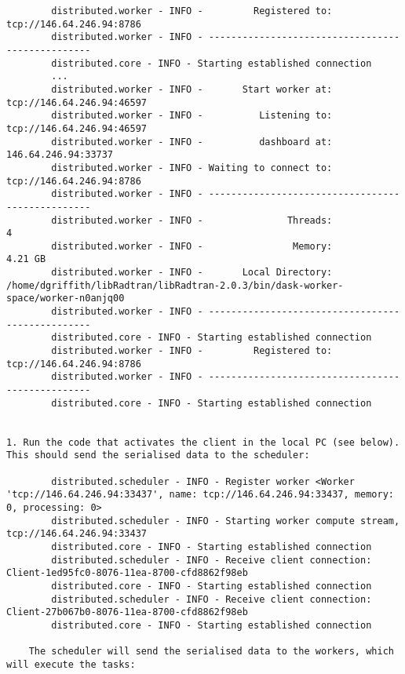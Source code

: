 \begin{lstlisting}
        distributed.worker - INFO -         Registered to:   tcp://146.64.246.94:8786
        distributed.worker - INFO - -------------------------------------------------
        distributed.core - INFO - Starting established connection
        ...
        distributed.worker - INFO -       Start worker at:  tcp://146.64.246.94:46597
        distributed.worker - INFO -          Listening to:  tcp://146.64.246.94:46597
        distributed.worker - INFO -          dashboard at:        146.64.246.94:33737
        distributed.worker - INFO - Waiting to connect to:   tcp://146.64.246.94:8786
        distributed.worker - INFO - -------------------------------------------------
        distributed.worker - INFO -               Threads:                          4
        distributed.worker - INFO -                Memory:                    4.21 GB
        distributed.worker - INFO -       Local Directory: /home/dgriffith/libRadtran/libRadtran-2.0.3/bin/dask-worker-space/worker-n0anjq00
        distributed.worker - INFO - -------------------------------------------------
        distributed.core - INFO - Starting established connection
        distributed.worker - INFO -         Registered to:   tcp://146.64.246.94:8786
        distributed.worker - INFO - -------------------------------------------------
        distributed.core - INFO - Starting established connection


1. Run the code that activates the client in the local PC (see below). This should send the serialised data to the scheduler:

        distributed.scheduler - INFO - Register worker <Worker 'tcp://146.64.246.94:33437', name: tcp://146.64.246.94:33437, memory: 0, processing: 0>
        distributed.scheduler - INFO - Starting worker compute stream, tcp://146.64.246.94:33437
        distributed.core - INFO - Starting established connection
        distributed.scheduler - INFO - Receive client connection: Client-1ed95fc0-8076-11ea-8700-cfd8862f98eb
        distributed.core - INFO - Starting established connection
        distributed.scheduler - INFO - Receive client connection: Client-27b067b0-8076-11ea-8700-cfd8862f98eb
        distributed.core - INFO - Starting established connection

    The scheduler will send the serialised data to the workers, which will execute the tasks:
    

\end{lstlisting}
